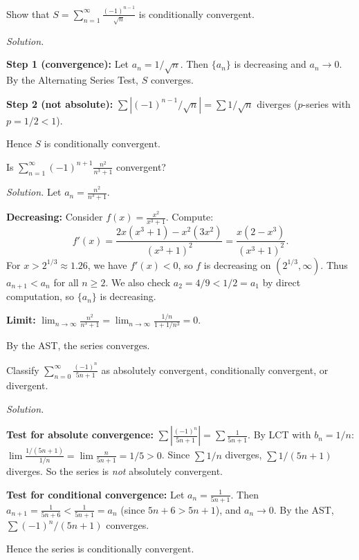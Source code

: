 \begin{examplebox}[title={Worked Example (Lecture Example 5.11): $\sum (-1)^{n-1}/\sqrt{n}$ is conditionally convergent}]
Show that $S=\displaystyle\sum_{n=1}^{\infty}\frac{(-1)^{n-1}}{\sqrt{n}}$ is conditionally convergent.

\emph{Solution.}

\textbf{Step 1 (convergence):}
Let $a_n=1/\sqrt{n}$. Then $\{a_n\}$ is decreasing and $a_n\to 0$.
By the Alternating Series Test, $S$ converges.

\textbf{Step 2 (not absolute):}
$\sum|(-1)^{n-1}/\sqrt{n}|=\sum 1/\sqrt{n}$ diverges ($p$-series with $p=1/2<1$).

Hence $S$ is $\boxed{\text{conditionally convergent}}$.
\end{examplebox}

\begin{examplebox}[title={Worked Example (Lecture Example 5.12): $\sum (-1)^{n+1}\frac{n^2}{n^3+1}$ converges by AST}]
Is $\displaystyle\sum_{n=1}^{\infty}(-1)^{n+1}\frac{n^2}{n^3+1}$ convergent?

\emph{Solution.}
Let $a_n=\frac{n^2}{n^3+1}$.

\textbf{Decreasing:}
Consider $f(x)=\frac{x^2}{x^3+1}$. Compute:
\[
f'(x)=\frac{2x(x^3+1)-x^2(3x^2)}{(x^3+1)^2}=\frac{x(2-x^3)}{(x^3+1)^2}.
\]
For $x>2^{1/3}\approx 1.26$, we have $f'(x)<0$, so $f$ is decreasing on $(2^{1/3},\infty)$.
Thus $a_{n+1}<a_n$ for all $n\ge 2$. We also check $a_2=4/9<1/2=a_1$ by direct computation, so $\{a_n\}$ is decreasing.

\textbf{Limit:} $\lim_{n\to\infty}\frac{n^2}{n^3+1}=\lim_{n\to\infty}\frac{1/n}{1+1/n^3}=0$.

By the AST, the series $\boxed{\text{converges}}$.
\end{examplebox}

\begin{examplebox}[title={Worked Example (Tutorial 10, Q1(a)): conditional convergence via AST + LCT}]
Classify $\displaystyle\sum_{n=0}^{\infty}\frac{(-1)^n}{5n+1}$ as absolutely convergent, conditionally convergent, or divergent.

\emph{Solution.}

\textbf{Test for absolute convergence:}
$\sum\left|\frac{(-1)^n}{5n+1}\right|=\sum\frac{1}{5n+1}$.
By LCT with $b_n=1/n$: $\lim\frac{1/(5n+1)}{1/n}=\lim\frac{n}{5n+1}=1/5>0$.
Since $\sum 1/n$ diverges, $\sum 1/(5n+1)$ diverges. So the series is \emph{not} absolutely convergent.

\textbf{Test for conditional convergence:}
Let $a_n=\frac{1}{5n+1}$. Then $a_{n+1}=\frac{1}{5n+6}<\frac{1}{5n+1}=a_n$ (since $5n+6>5n+1$), and $a_n\to 0$. By the AST, $\sum (-1)^n/(5n+1)$ converges.

Hence the series is $\boxed{\text{conditionally convergent}}$.
\end{examplebox}

